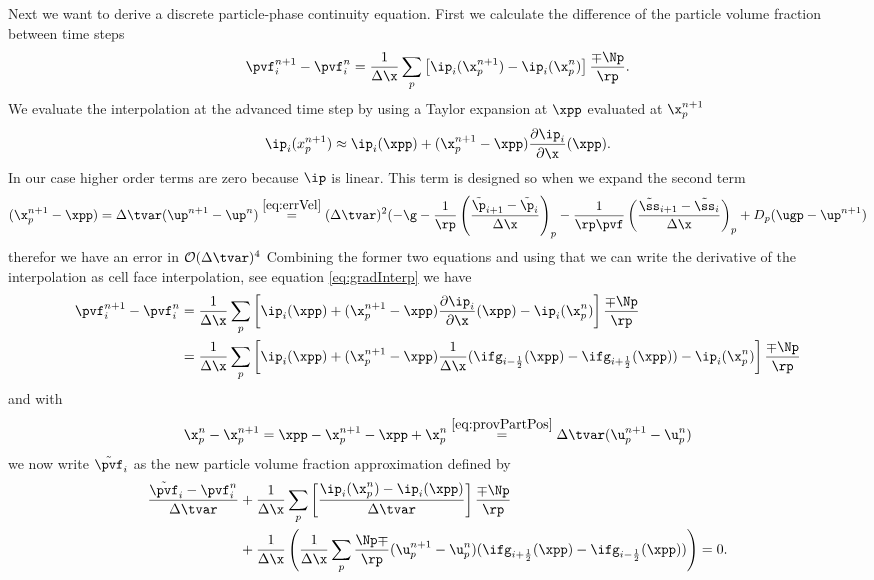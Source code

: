 Next we want to derive a discrete particle-phase continuity equation. 
First we calculate the difference of the particle volume fraction between time steps
\begin{align*}
    \pvf_i^{n+1} - \pvf_i^n = \dfrac{1}{\Delta \x} \sum_p \left[ \ip_i (\x_p^{n+1}) - \ip_{i} (\x_p^n) \right] \dfrac{\mp \Np}{\rp}.
\end{align*}
We evaluate the interpolation at the advanced time step by using a Taylor expansion at $\xpp$ evaluated at $\x_p^{n+1}$
\begin{equation*}
    \ip_i(x_p^{n+1}) \approx \ip_i (\xpp) + (\x_p^{n+1} - \xpp) \dfrac{\partial \ip_i}{\partial \x} (\xpp).
\end{equation*}
In our case higher order terms are zero because $\ip$ is linear.
This term is designed so when we expand the second term
\begin{equation*}
    (\x_p^{n+1} - \xpp ) = \Delta \tvar (\up^{n+1} - \up^n) \stackrel{\eqref{eq:errVel}}{=} (\Delta \tvar )^2 ( -\g - \dfrac{1}{\rp} \left( \dfrac{\tilde{\p}_{i+1} - \tilde{\p}_i}{\Delta \x} \right)_p - \dfrac{1}{\rp \pvf} \left( \dfrac{\tilde{\ss}_{i+1} - \tilde{\ss}_i}{\Delta \x} \right)_p + D_p ( \ugp - \up^{n+1})
\end{equation*}
therefor we have an error in $\mathcal{O}(\Delta \tvar )^4$
Combining the former two equations and using that we can write the derivative of the interpolation as cell face interpolation, see equation \eqref{eq:gradInterp} we have
\begin{align*}
    \pvf_i^{n+1} - \pvf_i^n &= \dfrac{1}{\Delta \x} \sum_p \left[ \ip_i (\xpp) + (\x_p^{n+1} - \xpp ) \dfrac{\partial \ip_i}{\partial \x} (\xpp) - \ip_i (\x_p^n) \right] \dfrac{\mp \Np}{\rp}  \\
    &= \dfrac{1}{\Delta \x} \sum_p \left[ \ip_i (\xpp) + (\x_p^{n+1} - \xpp ) 
    \dfrac{1}{\Delta \x} (\ifg_{i-\frac{1}{2}} (\xpp) - \ifg_{i+\frac{1}{2}} (\xpp))
    - \ip_i (\x_p^n) \right] \dfrac{\mp \Np}{\rp}
\end{align*}
and with
\begin{equation*}
    \x_p^{n} - \x_p^{n+1} = \xpp - \x_p^{n+1} - \xpp + \x_p^n \stackrel{\eqref{eq:provPartPos}}{=} \Delta \tvar (\u_p^{n+1} - \u_p^{n}) 
\end{equation*}
we now write $\tilde{\pvf}_i$ as the new particle volume fraction approximation defined by
\begin{equation}
\begin{aligned}
    \label{eq:fluidContDiscFull}
    \dfrac{\tilde{\pvf}_i - \pvf_i^n}{\Delta \tvar} &+ \dfrac{1}{\Delta \x} \sum_p \left[ \dfrac{\ip_i (\x_p^n) - \ip_i (\xpp)}{\Delta \tvar} \right] \dfrac{\mp \Np}{\rp} \\ 
    &+ \dfrac{1}{\Delta \x} \left( \dfrac{1}{\Delta \x} \sum_p \dfrac{\Np \mp}{\rp} (\u_p^{n+1} - \u_p^{n}) (\ifg_{i+\frac{1}{2}} (\xpp) - \ifg_{i-\frac{1}{2}}(\xpp) )
    \right) = 0.
\end{aligned}
\end{equation}
